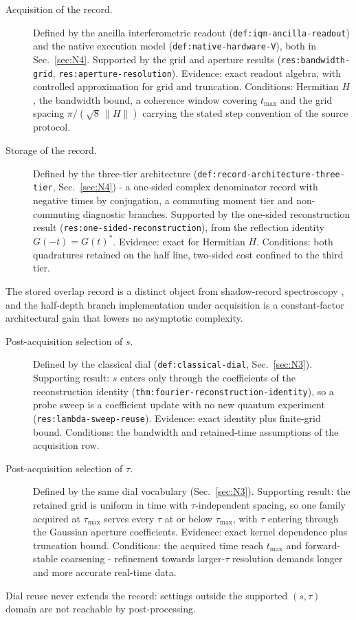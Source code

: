 \begin{description}
\item[Acquisition of the record.] Defined by the ancilla interferometric readout (\texttt{def:iqm-ancilla-readout}) and the native execution model (\texttt{def:native-hardware-V}), both in Sec.~\ref{sec:N4}. Supported by the grid and aperture results (\texttt{res:bandwidth-grid}, \texttt{res:aperture-resolution}). Evidence: exact readout algebra, with controlled approximation for grid and truncation. Conditions: Hermitian $H$, the bandwidth bound, a coherence window covering $t_{\max}$ and the grid spacing $\pi/(\sqrt{8}\,\lVert H\rVert)$ carrying the stated step convention of the source protocol.
\item[Storage of the record.] Defined by the three-tier architecture (\texttt{def:record-architecture-three-tier}, Sec.~\ref{sec:N4}) - a one-sided complex denominator record with negative times by conjugation, a commuting moment tier and non-commuting diagnostic branches. Supported by the one-sided reconstruction result (\texttt{res:one-sided-reconstruction}), from the reflection identity $G(-t)=G(t)^{*}$. Evidence: exact for Hermitian $H$. Conditions: both quadratures retained on the half line, two-sided cost confined to the third tier.
\end{description}
The stored overlap record is a distinct object from shadow-record spectroscopy \cite{chan2025shadow}, and the half-depth branch implementation under acquisition is a constant-factor architectural gain that lowers no asymptotic complexity.

\begin{description}
\item[Post-acquisition selection of $s$.] Defined by the classical dial (\texttt{def:classical-dial}, Sec.~\ref{sec:N3}). Supporting result: $s$ enters only through the coefficients of the reconstruction identity (\texttt{thm:fourier-reconstruction-identity}), so a probe sweep is a coefficient update with no new quantum experiment (\texttt{res:lambda-sweep-reuse}). Evidence: exact identity plus finite-grid bound. Conditions: the bandwidth and retained-time assumptions of the acquisition row.
\item[Post-acquisition selection of $\tau$.] Defined by the same dial vocabulary (Sec.~\ref{sec:N3}). Supporting result: the retained grid is uniform in time with $\tau$-independent spacing, so one family acquired at $\tau_{\max}$ serves every $\tau$ at or below $\tau_{\max}$, with $\tau$ entering through the Gaussian aperture coefficients. Evidence: exact kernel dependence plus truncation bound. Conditions: the acquired time reach $t_{\max}$ and forward-stable coarsening - refinement towards larger-$\tau$ resolution demands longer and more accurate real-time data.
\end{description}
Dial reuse never extends the record: settings outside the supported $(s,\tau)$ domain are not reachable by post-processing.

